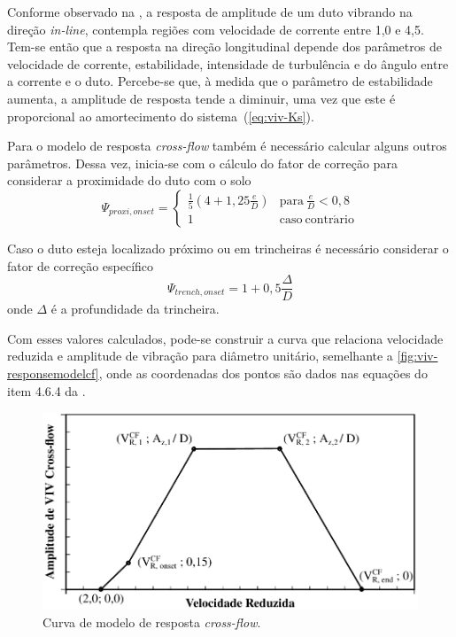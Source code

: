 Conforme observado na , a resposta de amplitude de um duto vibrando na direção \textit{in-line}, contempla regiões com velocidade de corrente entre 1,0 e 4,5.
Tem-se então que a resposta na direção longitudinal depende dos parâmetros de velocidade de corrente, estabilidade, intensidade de turbulência e do ângulo entre a corrente e o duto.
Percebe-se que, à medida que o parâmetro de estabilidade aumenta, a amplitude de resposta tende a diminuir, uma vez que este é proporcional ao amortecimento do sistema~(\autoref{eq:viv-Ks}).

Para o modelo de resposta \textit{cross-flow} também  é necessário calcular alguns outros parâmetros. Dessa vez, inicia-se com o cálculo do fator de correção para considerar a proximidade do duto com o solo
\begin{equation}
\label{eq:viv-Psi}
\Psi_{\mathit{proxi}, \mathit{onset}} =
\begin{cases}
\frac{1}{5}\left(4 + 1,25\frac{e}{D} \right) & \mathrm{para}~\frac{e}{D} < 0,8\\
1                                            & \mathrm{caso~contr\acute{a}rio}
\end{cases}
\end{equation}

Caso o duto esteja localizado próximo ou em trincheiras é necessário considerar o fator de correção específico
\begin{equation}
\label{eq:viv-Psitren}
\Psi_{\mathit{trench}, \mathit{onset}} = 1 + 0,5\frac{\Delta}{D}
\end{equation}
onde $\Delta$ é a profundidade da trincheira.

Com esses valores calculados, pode-se construir a curva que relaciona velocidade reduzida e amplitude de vibração para diâmetro unitário, semelhante a \autoref{fig:viv-responsemodelcf}, onde as coordenadas dos pontos são dados nas equações do item 4.6.4 da .

\begin{figure}[!ht]
    \centering
    \caption{Curva de modelo de resposta \textit{cross-flow}.}\label{fig:viv-responsemodelcf}
    \includegraphics[width=0.65\linewidth]{imagens/response_model_CF}
\end{figure}


